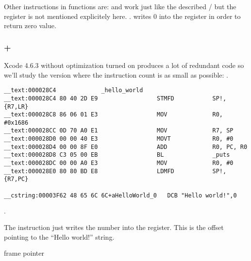 {Other instructions in functions are: \PUSH and \POP work just like the described / but the \SP register is not mentioned explicitely here}.
 .
 
{writes $0$ into the \Rzero register in order to return zero value}.

\subsubsection{\OptimizingXcode + \ARMMode}

Xcode 4.6.3 
{without optimization turned on produces a lot of redundant code so we'll study the version where the instruction count is as small as possible}: \Othree.

\begin{lstlisting}[caption=\OptimizingXcode + \ARMMode]
__text:000028C4             _hello_world
__text:000028C4 80 40 2D E9                 STMFD           SP!, {R7,LR}
__text:000028C8 86 06 01 E3                 MOV             R0, #0x1686
__text:000028CC 0D 70 A0 E1                 MOV             R7, SP
__text:000028D0 00 00 40 E3                 MOVT            R0, #0
__text:000028D4 00 00 8F E0                 ADD             R0, PC, R0
__text:000028D8 C3 05 00 EB                 BL              _puts
__text:000028DC 00 00 A0 E3                 MOV             R0, #0
__text:000028E0 80 80 BD E8                 LDMFD           SP!, {R7,PC}

__cstring:00003F62 48 65 6C 6C+aHelloWorld_0   DCB "Hello world!",0
\end{lstlisting}

  \AndENRU {} .

{The \MOV instruction just writes the number  into the \Rzero register.
This is the offset pointing to the ``Hello world!'' string}.

\cite{IOSABI}
 frame pointer

